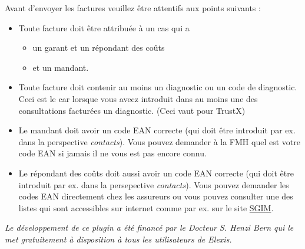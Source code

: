 Avant d'envoyer les factures veuillez être attentifs aux points suivants :
\begin{itemize}
 \item Toute facture doit être attribuée à un cas qui a
\begin{itemize}
 \item un garant et un répondant des coûts
\item et un mandant.
\end{itemize}
\item Toute facture doit contenir au moins un diagnostic ou un code de diagnostic. Ceci est le car lorsque vous avecz introduit dans au moins une des consultations facturées un diagnostic. (Ceci vaut pour TrustX)
\item Le mandant doit avoir un code EAN correcte (qui doit être introduit par ex. dans la perspective \textit{contacts}). Vous pouvez demander à la FMH quel est votre code EAN si jamais il ne vous est pas encore connu.
\item Le répondant des coûts doit aussi avoir un code EAN correcte (qui doit être introduit par ex. dans la persepective \textit{contacts}). Vous pouvez demander les codes EAN directement chez les assureurs ou vous pouvez consulter une des listes qui sont accessibles sur internet comme par ex. sur le site \href{http://www.sgim.ch/info/tarmed/EAN_KV.pdf}{SGIM}.

\end{itemize}

\textit{Le développement de ce plugin a été financé par le Docteur S. Henzi Bern qui le met gratuitement à disposition à tous les utilisateurs de Elexis.}


